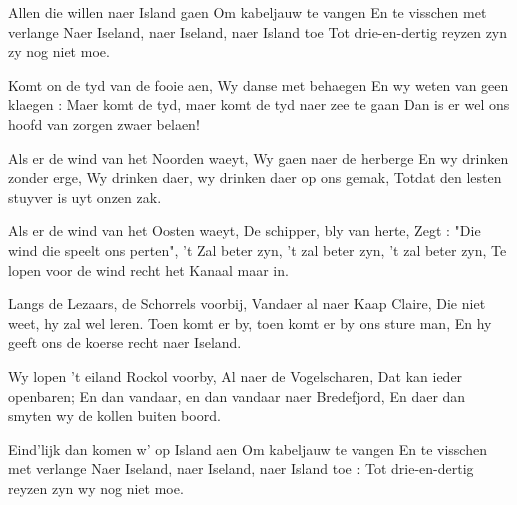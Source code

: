 \footnotemark [
ititle={Allen die willen naer Island gaen}]


\beginverse
Allen die willen naer Island gaen
Om kabeljauw te vangen
En te visschen met verlange
Naer Iseland, naer Iseland, naer Island toe
Tot drie-en-dertig reyzen zyn zy nog niet moe.
\endverse

\beginverse
Komt on de tyd van de fooie aen,
Wy danse met behaegen
En wy weten van geen klaegen :
Maer komt de tyd, maer komt de tyd naer zee te gaan
Dan is er wel ons hoofd van zorgen zwaer belaen!
\endverse

\beginverse
Als er de wind van het Noorden waeyt,
Wy gaen naer de herberge
En wy drinken zonder erge,
Wy drinken daer, wy drinken daer op ons gemak,
Totdat den lesten stuyver is uyt onzen zak.
\endverse

\beginverse
Als er de wind van het Oosten waeyt,
De schipper, bly van herte,
Zegt : "Die wind die speelt ons perten",
't Zal beter zyn, 't zal beter zyn, 't zal beter zyn,
Te lopen voor de wind recht het Kanaal maar in.
\endverse

\beginverse
Langs de Lezaars, de Schorrels voorbij,
Vandaer al naer Kaap Claire,
Die niet weet, hy zal wel leren.
Toen komt er by, toen komt er by ons sture man,
En hy geeft ons de koerse recht naer Iseland.
\endverse

\beginverse
Wy lopen 't eiland Rockol voorby,
Al naer de Vogelscharen,
Dat kan ieder openbaren;
En dan vandaar, en dan vandaar naer Bredefjord,
En daer dan smyten wy de kollen buiten boord.
\endverse

\beginverse
Eind'lijk dan komen w' op Island aen
Om kabeljauw te vangen
En te visschen met verlange
Naer Iseland, naer Iseland, naer Island toe :
Tot drie-en-dertig reyzen zyn wy nog niet moe.
\endverse
\endsong